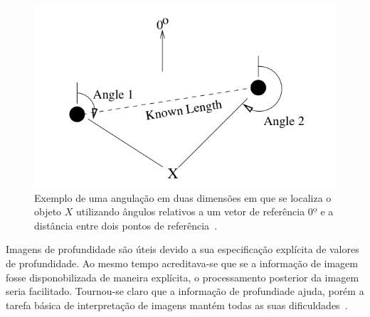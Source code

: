 	\begin{figure}[hbt]
		\begin{center}
			\includegraphics[scale=0.5]{figuras/2.FundamentacaoTeorica/angulation.png}
		\end{center}
		\caption{Exemplo de uma angulação em duas dimensões em que se localiza o objeto $\displaystyle X$ utilizando ângulos relativos a um vetor de referência $\displaystyle 0º$ e a distância entre dois pontos de referência~\cite{triangulacao}.}
		\label{angulation}
	\end{figure}


	Imagens de profundidade são úteis devido a sua especificação explícita de valores de profundidade. Ao mesmo tempo acreditava-se que se a informação de imagem fosse disponobilizada de maneira explícita, o processamento posterior da imagem seria facilitado. Tournou-se claro que a informação de profundiade ajuda, porém a tarefa básica de interpretação de imagens mantém todas as suas dificuldades~\cite{jain}.

